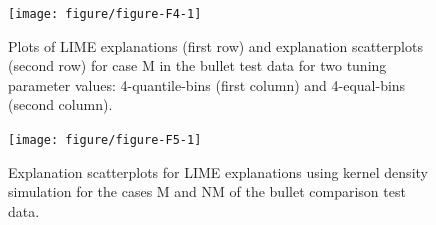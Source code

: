 \documentclass[AMS,STIX2COL]{WileyNJD-v2}\usepackage[]{graphicx}\usepackage[]{color}
\newenvironment{knitrout}{}{} %
\begin{document}
\begin{figure}[!t]
\begin{knitrout}
\color{fgcolor}

{\centering \texttt{[image: figure/figure-F4-1]} 

}



\end{knitrout}
\caption{Plots of LIME explanations (first row) and explanation scatterplots (second row) for case M in the bullet test data for two tuning parameter values: 4-quantile-bins (first column) and 4-equal-bins (second column).}
\label{fig:figure-F4}
\end{figure}

\begin{figure}[!thp]
\begin{knitrout}
\color{fgcolor}

{\centering \texttt{[image: figure/figure-F5-1]} 

}



\end{knitrout}
\caption{Explanation scatterplots for LIME explanations using kernel density simulation for the cases M and NM of the bullet comparison test data.}
\label{fig:figure-F5}
\end{figure}
\end{document}
